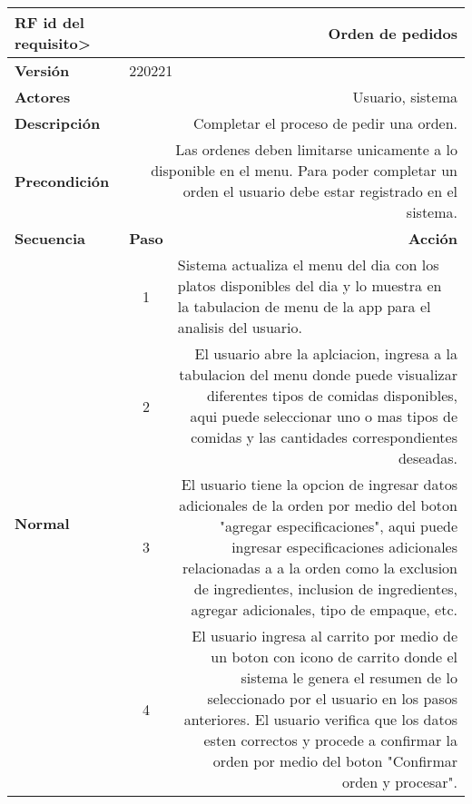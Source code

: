 \documentclass[conference]{IEEEtran}
\begin{document}
\begin{table}[H]
  \centering
  \begin{adjustbox}{width=0.47\textwidth}
    \begin{tabular}{|p{11.215em}|r|r|}
    \toprule
    \textbf{RF id del requisito>} & \multicolumn{2}{p{37.43em}|}{\textbf{Orden de pedidos}} \\
    \midrule
    \textbf{Versión} & \multicolumn{2}{l|}{220221} \\
    \midrule
    \textbf{Actores} & \multicolumn{2}{p{37.43em}|}{Usuario, sistema} \\
    \midrule
    \textbf{Descripción} & \multicolumn{2}{p{37.43em}|}{Completar el proceso de pedir una orden.} \\
    \midrule
    \textbf{Precondición} & \multicolumn{2}{p{37.43em}|}{Las ordenes deben limitarse unicamente a lo disponible en el menu. Para poder completar un orden el usuario debe estar registrado en el sistema.} \\
    \midrule
    \textbf{Secuencia} & \multicolumn{1}{p{5.43em}|}{\textbf{Paso}} & \multicolumn{1}{p{32em}|}{\textbf{Acción}} \\
    \midrule
    \multirow{7}[12]{*}{\textbf{Normal}} & \multicolumn{1}{c|}{\multirow{2}[2]{*}{1}} & \multicolumn{1}{l|}{\multirow{2}[2]{*}{Sistema actualiza el menu del dia con los platos disponibles del dia y lo muestra en la tabulacion de menu de la app para el analisis del usuario.}} \\
    \multicolumn{1}{|c|}{} &       &  \\
\cmidrule{2-3}    \multicolumn{1}{|c|}{} & \multicolumn{1}{c|}{2} & \multicolumn{1}{p{32em}|}{El usuario abre la aplciacion, ingresa a la tabulacion del menu donde puede visualizar diferentes tipos de comidas disponibles, aqui puede seleccionar uno o mas tipos de comidas y las cantidades correspondientes deseadas.} \\
\cmidrule{2-3}    \multicolumn{1}{|c|}{} & \multicolumn{1}{c|}{3} & \multicolumn{1}{p{32em}|}{El usuario tiene la opcion de ingresar datos adicionales de la orden por medio del boton "agregar especificaciones", aqui puede ingresar especificaciones adicionales relacionadas a a la orden como la exclusion de ingredientes, inclusion de ingredientes, agregar adicionales, tipo de empaque, etc.} \\
\cmidrule{2-3}    \multicolumn{1}{|c|}{} & \multicolumn{1}{c|}{4} & \multicolumn{1}{p{32em}|}{El usuario ingresa al carrito por medio de un boton con icono de carrito donde el sistema le genera el resumen de lo seleccionado por el usuario en los pasos anteriores. El usuario verifica que los datos esten correctos y procede a confirmar la orden por medio del boton "Confirmar orden y procesar".} \\

\end{tabular}
\end{adjustbox}
\end{table}
\end{document}
